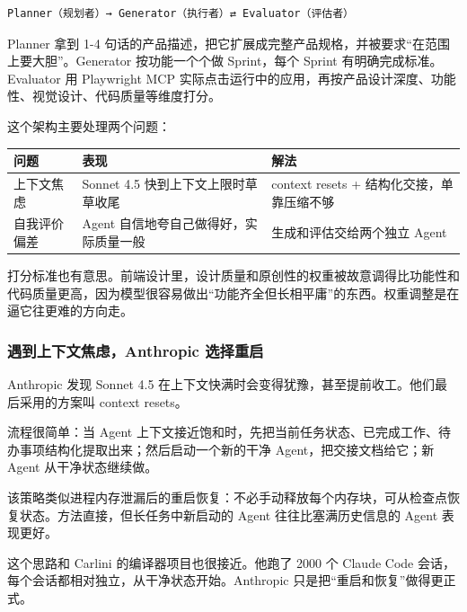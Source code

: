 \documentclass[9pt,a4paper,twocolumn]{ctexart}
\begin{document}
\begin{lstlisting}
Planner（规划者）→ Generator（执行者）⇄ Evaluator（评估者）
\end{lstlisting}



Planner 拿到 1-4 句话的产品描述，把它扩展成完整产品规格，并被要求“在范围上要大胆”。Generator 按功能一个个做 Sprint，每个 Sprint 有明确完成标准。Evaluator 用 Playwright MCP 实际点击运行中的应用，再按产品设计深度、功能性、视觉设计、代码质量等维度打分。



这个架构主要处理两个问题：


{\footnotesize
\begin{tabular}{|p{}|p{}|p{}|}
\hline
\textbf{问题} & \textbf{表现} & \textbf{解法} \\
\hline
上下文焦虑 & Sonnet 4.5 快到上下文上限时草草收尾 & context resets + 结构化交接，单靠压缩不够 \\
\hline
自我评价偏差 & Agent 自信地夸自己做得好，实际质量一般 & 生成和评估交给两个独立 Agent \\
\hline
\end{tabular}
}



打分标准也有意思。前端设计里，设计质量和原创性的权重被故意调得比功能性和代码质量更高，因为模型很容易做出“功能齐全但长相平庸”的东西。权重调整是在逼它往更难的方向走。



\subsubsection{遇到上下文焦虑，Anthropic 选择重启}


Anthropic 发现 Sonnet 4.5 在上下文快满时会变得犹豫，甚至提前收工。他们最后采用的方案叫 context resets。



流程很简单：当 Agent 上下文接近饱和时，先把当前任务状态、已完成工作、待办事项结构化提取出来；然后启动一个新的干净 Agent，把交接文档给它；新 Agent 从干净状态继续做。



该策略类似进程内存泄漏后的重启恢复：不必手动释放每个内存块，可从检查点恢复状态。方法直接，但长任务中新启动的 Agent 往往比塞满历史信息的 Agent 表现更好。



这个思路和 Carlini 的编译器项目也很接近。他跑了 2000 个 Claude Code 会话，每个会话都相对独立，从干净状态开始。Anthropic 只是把“重启和恢复”做得更正式。
\end{document}

